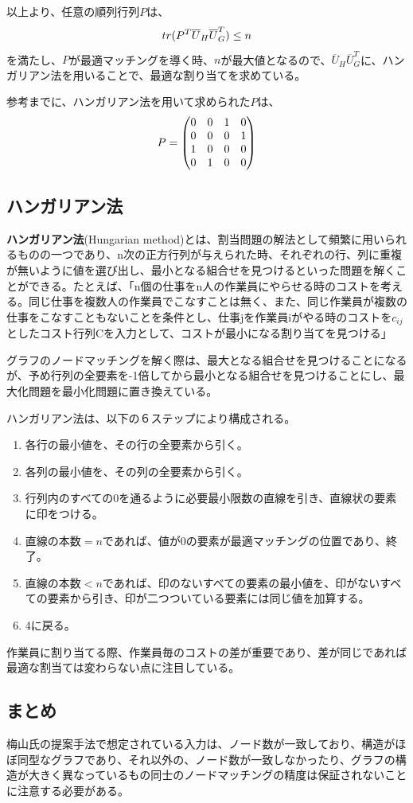 以上より、任意の順列行列$P$は、
\begin{equation}
  tr(P^T\overline{U}_H\overline{U}_G^T)\le n \notag
\end{equation}
を満たし、$P$が最適マッチングを導く時、$n$が最大値となるので、$\overline{U}_H\overline{U}_G^T$に、ハンガリアン法を用いることで、最適な割り当てを求めている。

参考までに、ハンガリアン法を用いて求められた$P$は、
\begin{equation}
  P=\begin{pmatrix}
    0 & 0 & 1 & 0 \\
    0 & 0 & 0 & 1 \\
    1 & 0 & 0 & 0 \\
    0 & 1 & 0 & 0
  \end{pmatrix} \notag
\end{equation}

\subsection{ハンガリアン法}
\textbf{ハンガリアン法}(Hungarian method)とは、割当問題の解法として頻繁に用いられるものの一つであり、n次の正方行列が与えられた時、それぞれの行、列に重複が無いように値を選び出し、最小となる組合せを見つけるといった問題を解くことができる。たとえば、「n個の仕事をn人の作業員にやらせる時のコストを考える。同じ仕事を複数人の作業員でこなすことは無く、また、同じ作業員が複数の仕事をこなすこともないことを条件とし、仕事jを作業員iがやる時のコストを$c_{ij}$としたコスト行列Cを入力として、コストが最小になる割り当てを見つける」

グラフのノードマッチングを解く際は、最大となる組合せを見つけることになるが、予め行列の全要素を-1倍してから最小となる組合せを見つけることにし、最大化問題を最小化問題に置き換えている。

ハンガリアン法は、以下の６ステップにより構成される。
\begin{enumerate}
  \item 各行の最小値を、その行の全要素から引く。
  \item 各列の最小値を、その列の全要素から引く。
  \item 行列内のすべての0を通るように必要最小限数の直線を引き、直線状の要素に印をつける。
  \item $直線の本数=n$であれば、値が0の要素が最適マッチングの位置であり、終了。
  \item $直線の本数<n$であれば、印のないすべての要素の最小値を、印がないすべての要素から引き、印が二つついている要素には同じ値を加算する。
  \item 4に戻る。
\end{enumerate}
作業員に割り当てる際、作業員毎のコストの差が重要であり、差が同じであれば最適な割当ては変わらない点に注目している。

\subsection{まとめ}
梅山氏の提案手法で想定されている入力は、ノード数が一致しており、構造がほぼ同型なグラフであり、それ以外の、ノード数が一致しなかったり、グラフの構造が大きく異なっているもの同士のノードマッチングの精度は保証されないことに注意する必要がある。
